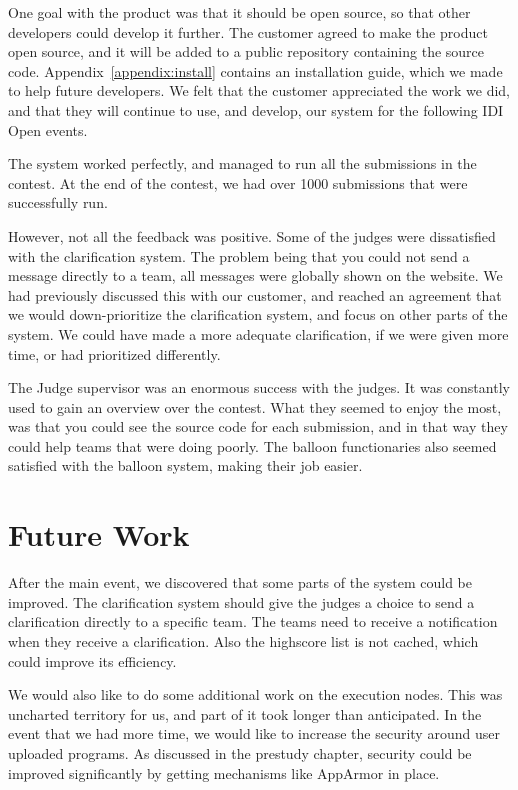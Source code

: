 One goal with the product was that it should be open source, so that
other developers could develop it further. The customer agreed to make
the product open source, and it will be added to a public repository
containing the source code. Appendix~\ref{appendix:install} contains an installation guide, which we made to help future
developers. We felt that the customer appreciated the work we did, and
that they will continue to use, and develop, our system for the
following IDI Open events.

The system worked perfectly, and managed to run all the submissions in
the contest. At the end of the contest, we had over 1000 submissions
that were successfully run. 

However, not all the feedback was positive. Some of the judges were
dissatisfied with the clarification system. The problem being that you
could not send a message directly to a team, all messages were globally
shown on the website. We had previously discussed this with our
customer, and reached an agreement that we would down-prioritize the
clarification system, and focus on other parts of the system. We could
have made a more adequate clarification, if we were given more time, or
had prioritized differently. 

The Judge supervisor was an enormous
success with the judges. It was constantly used to gain an overview
over the contest. What they seemed to enjoy the most, was that you
could see the source code for each submission, and in that way they
could help teams that were doing poorly. The balloon functionaries also
seemed satisfied with the balloon system, making their job easier. \ 


\section{Future Work}

After the main event, we discovered that some parts of the system could
be improved. The clarification system should give the judges a choice
to send a clarification directly to a specific team. The teams need to
receive a notification when they receive a clarification. Also the
highscore list is not cached, which could improve its efficiency.

We would also like to do some additional work on the execution nodes.
This was uncharted territory for us, and part of it took longer than
anticipated. In the event that we had more time, we would like to
increase the security around user uploaded programs. As discussed in
the prestudy chapter, security could be improved significantly by
getting mechanisms like AppArmor in place.

